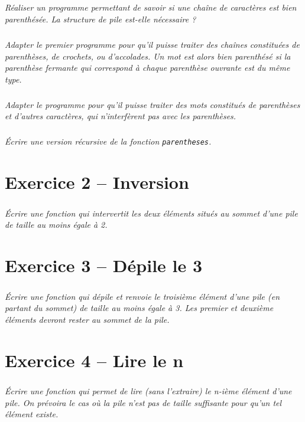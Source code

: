 \subparagraph{}
\textit{Réaliser un programme permettant de savoir si une chaîne de caractères est bien parenthésée. La structure de pile est-elle nécessaire ?}
\ifprof
\begin{corrige}
\end{corrige}
\else
\fi


\subparagraph{}
\textit{Adapter le premier programme pour qu'il puisse traiter des chaînes constituées de parenthèses, de crochets, ou d'accolades. Un mot est alors bien parenthésé si la parenthèse fermante qui correspond à chaque parenthèse ouvrante est du même type.}
\ifprof
\begin{corrige}
\end{corrige}
\else
\fi

\subparagraph{}
\textit{Adapter le programme pour qu’il puisse traiter des mots constitués de parenthèses et
d’autres caractères, qui n’interfèrent pas avec les parenthèses.}
\ifprof
\begin{corrige}
\end{corrige}
\else
\fi


\subparagraph{}
\textit{Écrire une version récursive de la fonction \texttt{parentheses}.}
\ifprof
\begin{corrige}
\end{corrige}
\else
\fi


\section*{Exercice 2 -- Inversion}
\subparagraph*{}
\setcounter{exo}{0}
\textit{Écrire une fonction qui intervertit les deux éléments situés au sommet d’une pile de taille
au moins égale à 2.}
\ifprof
\begin{corrige}
\end{corrige}
\else
\fi


\section*{Exercice 3 -- Dépile le 3\ieme}
\setcounter{exo}{0}
\subparagraph*{}
\textit{Écrire une fonction qui dépile et renvoie le troisième élément d’une pile (en partant du sommet) de taille au moins
égale à 3. Les premier et deuxième éléments devront rester au sommet de la pile.}
\ifprof
\begin{corrige}
\end{corrige}
\else
\fi

\section*{Exercice 4 -- Lire  le n\ieme}
\setcounter{exo}{0}
\subparagraph*{}
\textit{Écrire une fonction qui permet de lire (sans l’extraire) le n-ième élément d’une pile. On
prévoira le cas où la pile n’est pas de taille suffisante pour qu’un tel élément existe.}
\ifprof
\begin{corrige}
\end{corrige}
\else
\fi

